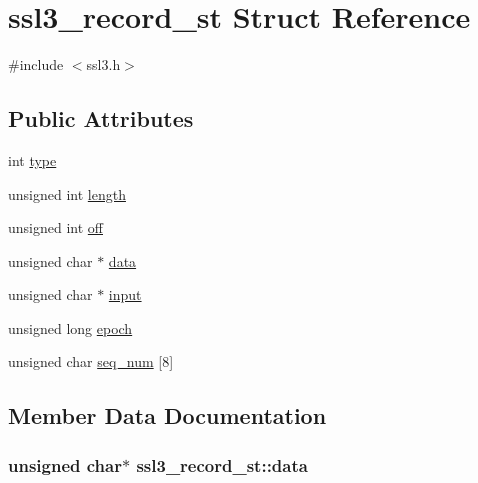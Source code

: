 \hypertarget{structssl3__record__st}{}\section{ssl3\+\_\+record\+\_\+st Struct Reference}
\label{structssl3__record__st}


{\ttfamily \#include $<$ssl3.\+h$>$}

\subsection*{Public Attributes}
\begin{DoxyCompactItemize}
\item 
int \hyperlink{structssl3__record__st_a51d0757184a963149122f4c020897002}{type}
\item 
unsigned int \hyperlink{structssl3__record__st_ac7ca2fdc9d81e439c02b314c3f6b44e0}{length}
\item 
unsigned int \hyperlink{structssl3__record__st_a6e1645baa9d3a07247d82d15cf54498a}{off}
\item 
unsigned char $\ast$ \hyperlink{structssl3__record__st_af6fe1b3b1e64483b05e1ede9e19607d2}{data}
\item 
unsigned char $\ast$ \hyperlink{structssl3__record__st_aa3a1dee09fd5b0a2732d43cfd81850b8}{input}
\item 
unsigned long \hyperlink{structssl3__record__st_a52c7ebb11114cf6efca3bbe70a7e0c31}{epoch}
\item 
unsigned char \hyperlink{structssl3__record__st_ab6ec6fd50c32c24851277e3e5f70f38f}{seq\+\_\+num} \mbox{[}8\mbox{]}
\end{DoxyCompactItemize}


\subsection{Member Data Documentation}
\subsubsection[{\texorpdfstring{data}{data}}]{\setlength{\rightskip}{0pt plus 5cm}unsigned char$\ast$ ssl3\+\_\+record\+\_\+st\+::data}\hypertarget{structssl3__record__st_af6fe1b3b1e64483b05e1ede9e19607d2}{}\label{structssl3__record__st_af6fe1b3b1e64483b05e1ede9e19607d2}
